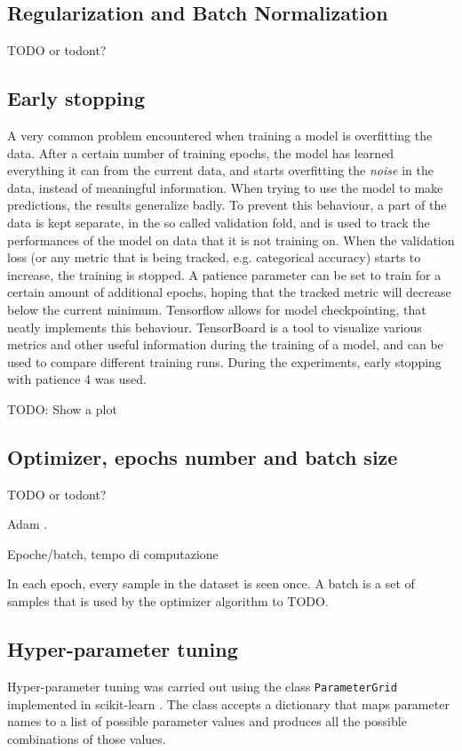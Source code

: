 \subsection{Regularization and Batch Normalization}
TODO or todont?

\subsection{Early stopping}

A very common problem encountered when training a model is overfitting the
data. After a certain number of training epochs, the model has learned
everything it can from the current data, and starts overfitting the
\textit{noise} in the data, instead of meaningful information.
When trying to use the model to make predictions, the results generalize badly.
To prevent this behaviour, a part of the data is kept separate, in the so
called validation fold, and is used to track the performances of the model on
data that it is not training on.
When the validation loss (or any metric that is being tracked, e.g. categorical
accuracy) starts to increase, the training is stopped.
A patience parameter can be set to train for a certain amount of additional
epochs, hoping that the tracked metric will decrease below the current minimum.
Tensorflow allows for model checkpointing, that neatly implements this
behaviour.
TensorBoard is a tool to visualize various metrics and other useful information
during the training of a model, and can be used to compare different training
runs.
During the experiments, early stopping with patience 4 was used.

TODO: Show a plot

\subsection{Optimizer, epochs number and batch size}
TODO or todont?

Adam \cite{kingma2017adam}.

Epoche/batch, tempo di computazione

In each epoch, every sample in the dataset is seen once.
A batch is a set of samples that is used by the optimizer 
algorithm to TODO.

\subsection{Hyper-parameter tuning}

Hyper-parameter tuning was carried out using the class \texttt{ParameterGrid}
implemented in scikit-learn \cite{scikit-learn}.
The class accepts a dictionary that maps parameter names to a list of possible
parameter values and produces all the possible combinations of those values.

